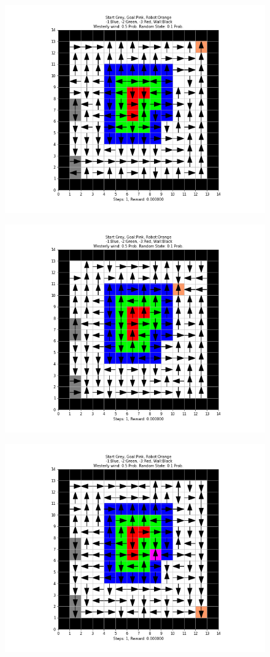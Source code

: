 \documentclass[12pt, letterpaper, twoside]{report}
\begin{document}
\begin{figure}[h!]
  \centering
    \includegraphics[width=0.8\linewidth]{Sarsa_Problem_A.png}
  \label{fig:Eps-Greedy}
\end{figure}
\begin{figure}[h!]
  \centering
    \includegraphics[width=0.8\linewidth]{Sarsa__Problem_B.png}
  \label{fig:Eps-Greedy}
\end{figure}
\begin{figure}[h!]
  \centering
    \includegraphics[width=0.8\linewidth]{Sarsa_Problem_C.png}
  \label{fig:Eps-Greedy}
\end{figure}
\end{document}
